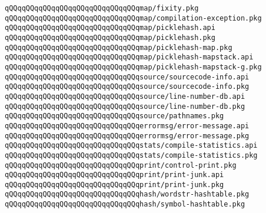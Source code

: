 \verb|qQQqqQQqqQQqqQQqqQQqqQQqqQQqqQQqmap/fixity.pkg|\newline
\verb|qQQqqQQqqQQqqQQqqQQqqQQqqQQqqQQqmap/compilation-exception.pkg|\newline
\verb|qQQqqQQqqQQqqQQqqQQqqQQqqQQqqQQqmap/picklehash.api|\newline
\verb|qQQqqQQqqQQqqQQqqQQqqQQqqQQqqQQqmap/picklehash.pkg|\newline
\verb|qQQqqQQqqQQqqQQqqQQqqQQqqQQqqQQqmap/picklehash-map.pkg|\newline
\verb|qQQqqQQqqQQqqQQqqQQqqQQqqQQqqQQqmap/picklehash-mapstack.api|\newline
\verb|qQQqqQQqqQQqqQQqqQQqqQQqqQQqqQQqmap/picklehash-mapstack-g.pkg|\newline
\newline
\verb|qQQqqQQqqQQqqQQqqQQqqQQqqQQqqQQqsource/sourcecode-info.api|\newline
\verb|qQQqqQQqqQQqqQQqqQQqqQQqqQQqqQQqsource/sourcecode-info.pkg|\newline
\verb|qQQqqQQqqQQqqQQqqQQqqQQqqQQqqQQqsource/line-number-db.api|\newline
\verb|qQQqqQQqqQQqqQQqqQQqqQQqqQQqqQQqsource/line-number-db.pkg|\newline
\verb|qQQqqQQqqQQqqQQqqQQqqQQqqQQqqQQqsource/pathnames.pkg|\newline
\newline
\verb|qQQqqQQqqQQqqQQqqQQqqQQqqQQqqQQqerrormsg/error-message.api|\newline
\verb|qQQqqQQqqQQqqQQqqQQqqQQqqQQqqQQqerrormsg/error-message.pkg|\newline
\newline
\verb|qQQqqQQqqQQqqQQqqQQqqQQqqQQqqQQqstats/compile-statistics.api|\newline
\verb|qQQqqQQqqQQqqQQqqQQqqQQqqQQqqQQqstats/compile-statistics.pkg|\newline
\newline
\verb|qQQqqQQqqQQqqQQqqQQqqQQqqQQqqQQqprint/control-print.pkg|\newline
\verb|qQQqqQQqqQQqqQQqqQQqqQQqqQQqqQQqprint/print-junk.api|\newline
\verb|qQQqqQQqqQQqqQQqqQQqqQQqqQQqqQQqprint/print-junk.pkg|\newline
\newline
\verb|qQQqqQQqqQQqqQQqqQQqqQQqqQQqqQQqhash/wordstr-hashtable.pkg|\newline
\verb|qQQqqQQqqQQqqQQqqQQqqQQqqQQqqQQqhash/symbol-hashtable.pkg|\newline
\newline
